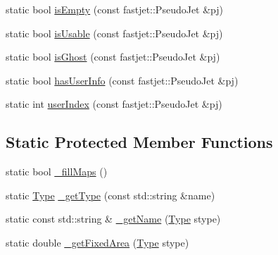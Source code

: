 \begin{DoxyCompactItemize}
static bool \hyperlink{classAnalysis_1_1FastJet_1_1UserInfo_a79ba59c5af9a4bc2e641ab2e54e8d50b}{is\+Empty} (const fastjet\+::\+Pseudo\+Jet \&pj)
\item 
static bool \hyperlink{classAnalysis_1_1FastJet_1_1UserInfo_a18b23aae344587ff280a046e70af1d29}{is\+Usable} (const fastjet\+::\+Pseudo\+Jet \&pj)
\item 
static bool \hyperlink{classAnalysis_1_1FastJet_1_1UserInfo_a4682fdc7e258328293b05951f55cc7a1}{is\+Ghost} (const fastjet\+::\+Pseudo\+Jet \&pj)
\item 
static bool \hyperlink{classAnalysis_1_1FastJet_1_1UserInfo_a681f1076b15320ea55e7104b4fe01c3a}{has\+User\+Info} (const fastjet\+::\+Pseudo\+Jet \&pj)
\item 
static int \hyperlink{classAnalysis_1_1FastJet_1_1UserInfo_a767f93f891d045f209198cdf72fddf36}{user\+Index} (const fastjet\+::\+Pseudo\+Jet \&pj)
\end{DoxyCompactItemize}
\subsection*{Static Protected Member Functions}
\begin{DoxyCompactItemize}
\item 
static bool \hyperlink{classAnalysis_1_1FastJet_1_1CaloSignalInfo_a60da06d7be16ac2b2456058812c02dd2}{\+\_\+fill\+Maps} ()
\item 
static \hyperlink{classAnalysis_1_1FastJet_1_1CaloSignalInfo_ac03e8f6d7fb631eab49a9ab02cda7675}{Type} \hyperlink{classAnalysis_1_1FastJet_1_1CaloSignalInfo_a5523d02e32bfeac621414ac3708da634}{\+\_\+get\+Type} (const std\+::string \&name)
\item 
static const std\+::string \& \hyperlink{classAnalysis_1_1FastJet_1_1CaloSignalInfo_ae8d06605ae61b010fba0605ccd626681}{\+\_\+get\+Name} (\hyperlink{classAnalysis_1_1FastJet_1_1CaloSignalInfo_ac03e8f6d7fb631eab49a9ab02cda7675}{Type} stype)
\item 
static double \hyperlink{classAnalysis_1_1FastJet_1_1CaloSignalInfo_a100c863de34ba4181d425a4c4609da83}{\+\_\+get\+Fixed\+Area} (\hyperlink{classAnalysis_1_1FastJet_1_1CaloSignalInfo_ac03e8f6d7fb631eab49a9ab02cda7675}{Type} stype)
\end{DoxyCompactItemize}
